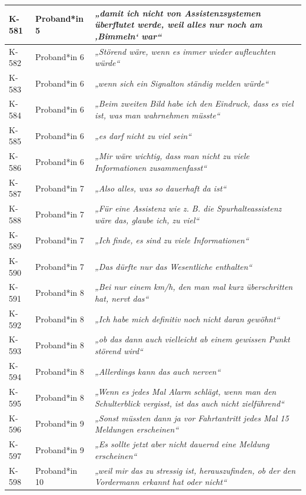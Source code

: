{\begin{xltabular}{\textwidth}{
    |P{0.10\textwidth}
    |P{0.17\textwidth}
    |Y|
}
\hline
K-581 & Proband*in 5 & \textit{„damit ich nicht von Assistenzsystemen überflutet werde, weil alles nur noch am ‚Bimmeln‘ war“} \\
\hline
K-582 & Proband*in 6 & \textit{„Störend wäre, wenn es immer wieder aufleuchten würde“} \\
\hline
K-583 & Proband*in 6 & \textit{„wenn sich ein Signalton ständig melden würde“} \\
\hline
K-584 & Proband*in 6 & \textit{„Beim zweiten Bild habe ich den Eindruck, dass es viel ist, was man wahrnehmen müsste“} \\
\hline
K-585 & Proband*in 6 & \textit{„es darf nicht zu viel sein“} \\
\hline
K-586 & Proband*in 6 & \textit{„Mir wäre wichtig, dass man nicht zu viele Informationen zusammenfasst“} \\
\hline
K-587 & Proband*in 7 & \textit{„Also alles, was so dauerhaft da ist“} \\
\hline
K-588 & Proband*in 7 & \textit{„Für eine Assistenz wie z. B. die Spurhalteassistenz wäre das, glaube ich, zu viel“} \\
\hline
K-589 & Proband*in 7 & \textit{„Ich finde, es sind zu viele Informationen“} \\
\hline
K-590 & Proband*in 7 & \textit{„Das dürfte nur das Wesentliche enthalten“} \\
\hline
K-591 & Proband*in 8 & \textit{„Bei nur einem km/h, den man mal kurz überschritten hat, nervt das“} \\
\hline
K-592 & Proband*in 8 & \textit{„Ich habe mich definitiv noch nicht daran gewöhnt“} \\
\hline
K-593 & Proband*in 8 & \textit{„ob das dann auch vielleicht ab einem gewissen Punkt störend wird“} \\
\hline
K-594 & Proband*in 8 & \textit{„Allerdings kann das auch nerven“} \\
\hline
K-595 & Proband*in 8 & \textit{„Wenn es jedes Mal Alarm schlägt, wenn man den Schulterblick vergisst, ist das auch nicht zielführend“} \\
\hline
K-596 & Proband*in 9 & \textit{„Sonst müssten dann ja vor Fahrtantritt jedes Mal 15 Meldungen erscheinen“} \\
\hline
K-597 & Proband*in 9 & \textit{„Es sollte jetzt aber nicht dauernd eine Meldung erscheinen“} \\
\hline
K-598 & Proband*in 10 & \textit{„weil mir das zu stressig ist, herauszufinden, ob der den Vordermann erkannt hat oder nicht“} \\

\end{xltabular}}
